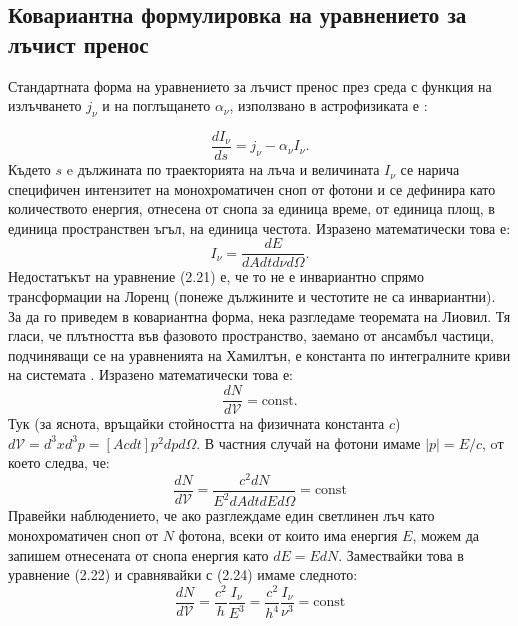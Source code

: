 \subsection{Ковариантна формулировка на уравнението за лъчист пренос}

Стандартната форма на уравнението за лъчист пренос през среда с функция на излъчването $j_\nu$ и на поглъщането $\alpha_\nu$, използвано в астрофизиката е \cite{Rad_processes}:

\begin{equation}
	\frac{dI_\nu}{ds} = j_\nu - \alpha_\nu I_\nu.
\end{equation}
Където $s$ e дължината по траекторията на лъча и величината $I_\nu$ се нарича специфичен интензитет на монохроматичен сноп от фотони и се дефинира като количеството енергия, отнесена от снопа за единица време, от единица площ, в единица пространствен ъгъл, на единица честота. Изразено математически това е:
\begin{equation}
	I_\nu = \frac{dE}{dAdtd\nu d\Omega}.
\end{equation}
Недостатъкът на уравнение (2.21) е, че то не е инвариантно спрямо трансформации на Лоренц (понеже дължините и честотите не са инвариантни). За да го приведем в ковариантна форма, нека разгледаме теоремата на Лиовил. Тя гласи, че плътността във фазовото пространство, заемано от ансамбъл частици, подчиняващи се на уравненията на Хамилтън, е константа по интегралните криви на системата \cite{Misner1973}. Изразено математически това е:
\begin{equation}
	\frac{dN}{d\mathcal{V}} = \text{const}.
\end{equation}
Тук (за яснота, връщайки стойността на физичната константа $c$) $d\mathcal{V} = d^3x d^3p = \left[A cdt\right] p^2dpd\Omega$. В частния случай на фотони имаме $|p| = E / c$, oт което следва, че:
\begin{equation}
	\frac{dN}{d\mathcal{V}} = \frac{c^2dN}{E^2dAdtdEd\Omega} = \text{const}
\end{equation}
Правейки наблюдението, че ако разглеждаме един светлинен лъч като монохроматичен сноп от $N$ фотона, всеки от които има енергия $E$, можем да запишем отнесената от снопа енергия като $dE = EdN$. Замествайки това в уравнение (2.22) и сравнявайки с (2.24) имаме следното:
\begin{equation}
	\frac{dN}{d\mathcal{V}} = \frac{c^2}{h}\frac{I_\nu}{E^3} = \frac{c^2}{h^4}\frac{I_\nu}{\nu^3} = \text{const}
\end{equation}

